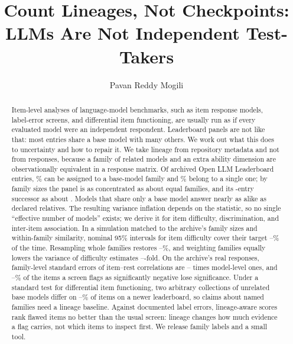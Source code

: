 \documentclass[10pt]{article}
\title{Count Lineages, Not Checkpoints:\\LLMs Are Not Independent Test-Takers}
\author{\name Pavan Reddy Mogili}
\date{}
\theoremstyle{remark}\newtheorem{remark}{Remark}
\begin{document}
\maketitle

\begin{abstract}
Item-level analyses of language-model benchmarks, such as item response
models, label-error screens, and differential item functioning, are usually
run as if every evaluated model were an independent respondent. Leaderboard
panels are not like that: most entries share a base model with many others. We
work out what this does to uncertainty and how to repair it.
We take lineage from repository metadata and not from responses, because a
family of related models and an extra ability dimension are observationally
equivalent in a response matrix. Of \NModels{} archived Open LLM Leaderboard
entries, \LineageCoverage\% can be assigned to a base-model family and
\LargestFamilyShare\% belong to a single one; by family sizes the panel is as
concentrated as about \EffClusters{} equal families, and its
\VtwoModels-entry successor as about \VtwoClusters. Models that share only a
base model answer nearly as alike as declared relatives.
The resulting variance inflation depends on the statistic, so no single
``effective number of models'' exists; we derive it for item difficulty,
discrimination, and inter-item association. In a simulation matched to the
archive's family sizes and within-family similarity, nominal 95\% intervals for
item difficulty cover their target
\SimNaiveCoverShared--\SimNaiveCoverUnrel\% of the time. Resampling whole
families restores \SimBootCoverLo--\SimBootCoverHi\%, and weighting families
equally lowers the variance of difficulty estimates
\WeightGainLo--\WeightGainHi-fold.
On the archive's real responses, family-level standard errors of item--rest
correlations are \ScreenSEMin--\ScreenSEMax{} times model-level ones, and
\ScreenLostMin--\ScreenLostMax\% of the items a screen flags as significantly
negative lose significance. Under a standard test for differential item
functioning, two arbitrary collections of unrelated base models differ on
\VrPlaceboMin--\VrPlaceboMax\% of items on a newer leaderboard, so claims
about named families need a lineage baseline. Against documented label
errors, lineage-aware scores rank flawed items no better than the usual
screen: lineage changes how much evidence a flag carries, not which items to
inspect first. We release family labels and a small tool.
\end{abstract}
\end{document}
